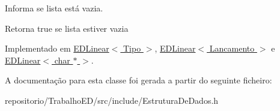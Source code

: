 Informa se lista está vazia. 

\begin{DoxyReturn}{Retorna}
true se lista estiver vazia 
\end{DoxyReturn}


Implementado em \hyperlink{classEDLinear_a29e7eaef660cda7d95897917b1b1973f}{E\-D\-Linear$<$ Tipo $>$}, \hyperlink{classEDLinear_a29e7eaef660cda7d95897917b1b1973f}{E\-D\-Linear$<$ Lancamento $>$} e \hyperlink{classEDLinear_a29e7eaef660cda7d95897917b1b1973f}{E\-D\-Linear$<$ char $\ast$ $>$}.



A documentação para esta classe foi gerada a partir do seguinte ficheiro\-:\begin{DoxyCompactItemize}
\item 
repositorio/\-Trabalho\-E\-D/src/include/Estrutura\-De\-Dados.\-h\end{DoxyCompactItemize}
